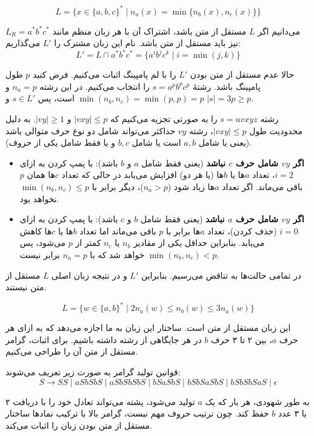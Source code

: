 \[
L = \{x \in \{a,b,c\}^* \mid n_a(x) = \min\{n_b(x), n_c(x)\}\}
\]

می‌دانیم اگر $L$ مستقل از متن باشد، اشتراک آن با هر زبان منظم مانند $L_R = a^* b^* c^*$ نیز باید مستقل از متن باشد. نام این زبان مشترک را $L'$ می‌گذاریم:
\[ L' = L \cap a^* b^* c^* = \{a^i b^j c^k \mid i = \min(j, k)\} \]

حالا عدم مستقل از متن بودن $L'$ را با لم پامپینگ اثبات می‌کنیم. فرض کنید $p$ طول پامپینگ باشد. رشتهٔ $s = a^p b^p c^p$ را انتخاب می‌کنیم. در این رشته $n_a = p$ و $\min(n_b, n_c) = \min(p, p) = p$ است، پس $s \in L'$ و $|s| = 3p \ge p$.

رشته $s = uvxyz$ را به صورتی تجزیه می‌کنیم که $|vxy| \le p$ و $|vy| \ge 1$. به دلیل محدودیت طول $|vxy| \le p$، رشته $vy$ حداکثر می‌تواند شامل دو نوع حرف متوالی باشد (یعنی یا شامل $a,b$ است یا شامل $b,c$ و یا فقط شامل یکی از حروف).
\begin{itemize}
    \item \textbf{اگر $vy$ شامل حرف $c$ نباشد} (یعنی فقط شامل $a$ و $b$ باشد):
    با پمپ کردن به ازای $i=2$، تعداد $a$ها یا $b$ها (یا هر دو) افزایش می‌یابد در حالی که تعداد $c$ها همان $p$ باقی می‌ماند. اگر تعداد $a$ها زیاد شود ($n_a > p$)، دیگر برابر با $\min(n_b, n_c) \le p$ نخواهد بود.
    
    \item \textbf{اگر $vy$ شامل حرف $a$ نباشد} (یعنی فقط شامل $b$ و $c$ باشد):
    با پمپ کردن به ازای $i=0$ (حذف کردن)، تعداد $a$ها برابر با $p$ باقی می‌ماند اما تعداد $b$ها یا $c$ها کاهش می‌یابد. بنابراین حداقل یکی از مقادیر $n_b$ یا $n_c$ کمتر از $p$ می‌شود، پس $\min(n_b, n_c) < p$ خواهد شد که با $n_a=p$ برابر نیست.
\end{itemize}
در تمامی حالت‌ها به تناقض می‌رسیم. بنابراین $L'$ و در نتیجه زبان اصلی $L$ مستقل از متن نیستند.

\[
L = \{w \in \{a,b\}^* \mid 2n_a(w) \le n_b(w) \le 3n_a(w)\}
\]

 این زبان {مستقل از متن است}. ساختار این زبان به ما اجازه می‌دهد که به ازای هر حرف $a$، بین ۲ تا ۳ حرف $b$ در هر جایگاهی از رشته داشته باشیم. برای اثبات، گرامر مستقل از متن آن را طراحی می‌کنیم.

قوانین تولید گرامر به صورت زیر تعریف می‌شوند:
\[
S \rightarrow SS \mid aSbSbS \mid aSbSbSbS \mid bSaSbS \mid bSbSaSbS \mid bSbSbSaS \mid \epsilon
\]

به طور شهودی، هر بار که یک $a$ تولید می‌شود، پشته می‌تواند تعادل خود را با دریافت ۲ یا ۳ عدد $b$ حفظ کند. چون ترتیب حروف مهم نیست، گرامر بالا با ترکیب نمادها ساختار مستقل از متن بودن زبان را اثبات می‌کند.
